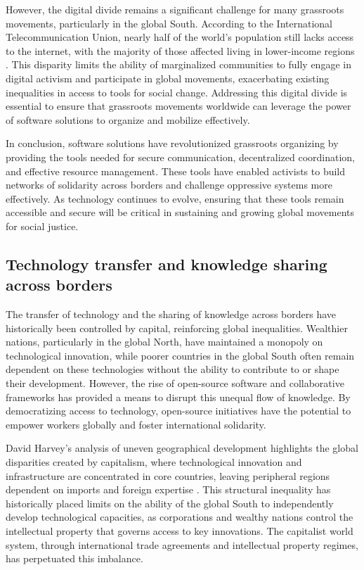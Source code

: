 \begin{refsection}
However, the digital divide remains a significant challenge for many grassroots movements, particularly in the global South. According to the International Telecommunication Union, nearly half of the world’s population still lacks access to the internet, with the majority of those affected living in lower-income regions \cite[pp.~210-213]{internationaltelecomstats}. This disparity limits the ability of marginalized communities to fully engage in digital activism and participate in global movements, exacerbating existing inequalities in access to tools for social change. Addressing this digital divide is essential to ensure that grassroots movements worldwide can leverage the power of software solutions to organize and mobilize effectively.

In conclusion, software solutions have revolutionized grassroots organizing by providing the tools needed for secure communication, decentralized coordination, and effective resource management. These tools have enabled activists to build networks of solidarity across borders and challenge oppressive systems more effectively. As technology continues to evolve, ensuring that these tools remain accessible and secure will be critical in sustaining and growing global movements for social justice.

\subsection{Technology transfer and knowledge sharing across borders}

The transfer of technology and the sharing of knowledge across borders have historically been controlled by capital, reinforcing global inequalities. Wealthier nations, particularly in the global North, have maintained a monopoly on technological innovation, while poorer countries in the global South often remain dependent on these technologies without the ability to contribute to or shape their development. However, the rise of open-source software and collaborative frameworks has provided a means to disrupt this unequal flow of knowledge. By democratizing access to technology, open-source initiatives have the potential to empower workers globally and foster international solidarity.

David Harvey’s analysis of uneven geographical development highlights the global disparities created by capitalism, where technological innovation and infrastructure are concentrated in core countries, leaving peripheral regions dependent on imports and foreign expertise \cite[pp.~86-88]{harveyspaces}. This structural inequality has historically placed limits on the ability of the global South to independently develop technological capacities, as corporations and wealthy nations control the intellectual property that governs access to key innovations. The capitalist world system, through international trade agreements and intellectual property regimes, has perpetuated this imbalance.


\end{refsection}
